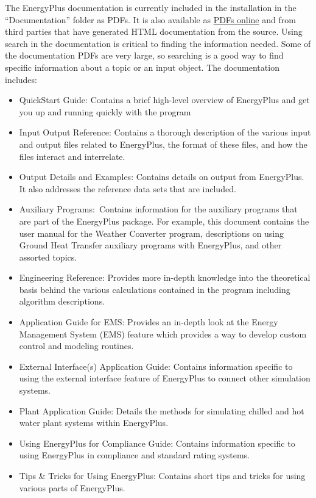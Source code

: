 The EnergyPlus documentation is currently included in the installation
in the ``Documentation'' folder as PDFs. It is also available as
\href{https://energyplus.net/documentation}{PDFs online} and from
third parties that have generated HTML documentation from the source.
Using search in the documentation is critical to finding the information
needed. Some of the documentation PDFs are very large, so searching
is a good way to find specific information about a topic or an input
object. The documentation includes:
\begin{itemize}
\item QuickStart Guide: Contains a brief high-level overview of EnergyPlus
and get you up and running quickly with the program
\item Input Output Reference: Contains a thorough description of the various
input and output files related to EnergyPlus, the format of these
files, and how the files interact and interrelate.
\item Output Details and Examples: Contains details on output from EnergyPlus.
It also addresses the reference data sets that are included.
\item Auxiliary Programs:~Contains information for the auxiliary programs
that are part of the EnergyPlus package. For example, this document
contains the user manual for the Weather Converter program, descriptions
on using Ground Heat Transfer auxiliary programs with EnergyPlus,
and other assorted topics.
\item Engineering Reference: Provides more in-depth knowledge into the theoretical
basis behind the various calculations contained in the program including
algorithm descriptions.
\item Application Guide for EMS: Provides an in-depth look at the Energy
Management System (EMS) feature which provides a way to develop custom
control and modeling routines.
\item External Interface(s) Application Guide: Contains information specific
to using the external interface feature of EnergyPlus to connect other
simulation systems.
\item Plant Application Guide: Details the methods for simulating chilled
and hot water plant systems within EnergyPlus.
\item Using EnergyPlus for Compliance Guide: Contains information specific
to using EnergyPlus in compliance and standard rating systems.
\item Tips \& Tricks for Using EnergyPlus: Contains short tips and tricks
for using various parts of EnergyPlus. 
\end{itemize}

